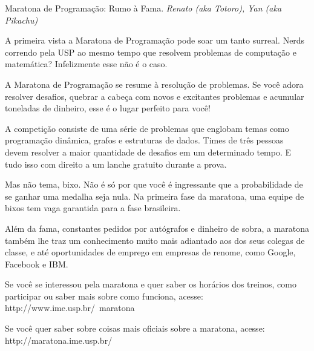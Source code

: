 \begin{secao}{Maratona de Programação: Rumo à Fama.}
{\em Renato (aka Totoro), Yan (aka Pikachu)} %

A primeira vista a Maratona de Programação pode soar um tanto
surreal. Nerds correndo pela USP ao mesmo tempo que resolvem
problemas de computação e matemática? Infelizmente esse não
é o caso.

A Maratona de Programação se resume à resolução de problemas.
Se você adora resolver desafios, quebrar a cabeça com novos
e excitantes problemas e acumular toneladas de dinheiro, esse
é o lugar perfeito para você!

A competição consiste de uma série de problemas que englobam
temas como programação dinâmica, grafos e estruturas de dados.
Times de três pessoas devem resolver a maior quantidade de
desafios em um determinado tempo. E tudo isso com direito
a um lanche gratuito durante a prova.

Mas não tema, bixo. Não é só por que você é ingressante que
a probabilidade de se ganhar uma medalha seja nula. Na primeira 
fase da maratona, uma equipe de bixos tem vaga garantida para a 
fase brasileira.

Além da fama, constantes pedidos por autógrafos e dinheiro de sobra,
a maratona também lhe traz um conhecimento muito mais 
adiantado aos dos seus colegas de classe, e até oportunidades
de emprego em empresas de renome, como Google, Facebook e IBM.

Se você se interessou pela maratona e quer saber os horários dos
treinos, como participar ou saber mais sobre como funciona, acesse:
http://www.ime.usp.br/~maratona

Se você quer saber sobre coisas mais oficiais sobre a maratona, acesse:
http://maratona.ime.usp.br/

\end{secao}
